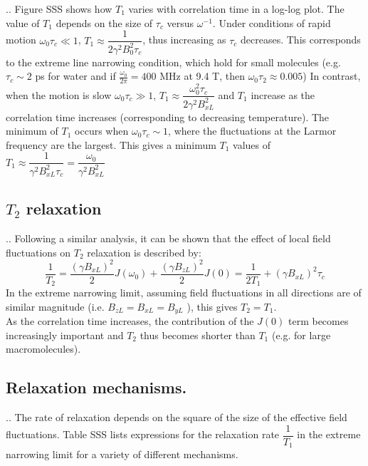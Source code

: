 \documentclass{beamer}
\begin{document}
\begin{frame}{\thesection.\thesubsection. \insertsubsection}
	  Figure SSS shows how $T_1$ varies with correlation time in a log-log plot. The value of $T_1$ depends on the size of $\tau_c$ versus $\omega^{-1}$. Under conditions of rapid motion $ \omega_0 \tau_c \ll 1$, $T_1 \approx \dfrac{1}{2 \gamma^2 B_0^2 \tau_c}$, thus increasing as $\tau_c$ decreases. This corresponds to the \alert{extreme line narrowing condition}, which hold for small molecules (e.g. $\tau_c \sim 2$ ps for water and if $\frac{\omega_0}{2 \pi}  = 400$ MHz at 9.4 T, then $\omega_0 \tau_2 \approx 0.005$)
	  In contrast, when the motion is slow $\omega_0 \tau_c \gg 1$, $T_1 \approx \dfrac{\omega_0^2 \tau_c}{2 \gamma^2 B_{xL}^2}$ and $T_1$ increase as the correlation time increases (corresponding to decreasing temperature).
	  The minimum of $T_1$ occurs when $\omega_0 \tau_c \sim 1$, where the fluctuations at the Larmor frequency are the largest. This gives a minimum $T_1$ values of $T_1 \approx \dfrac{1}{\gamma^2 B_{xL}^2 \tau_c} = \dfrac{\omega_0}{\gamma^2 B_{xL}^2}$
\end{frame}

\subsection{$T_2$ relaxation}
\begin{frame}{\thesection.\thesubsection. \insertsubsection}
	Following a similar analysis, it can be shown that the effect of local field fluctuations on $T_2$ relaxation is described by:
	\begin{equation} \label{eq: T2_relax}
	\dfrac{1}{T_2} = \dfrac{(\gamma B_{xL})^2}{2} J(\omega_0) + \dfrac{(\gamma B_{zL})^2}{2} J(0) = \dfrac{1}{2 T_1} + (\gamma B_{xL})^2 \tau_c
	\end{equation}
	In the extreme narrowing limit, assuming field fluctuations in all directions are of similar magnitude (i.e. $B_{zL} = B_{xL} = B_{yL}$ ), this gives $T_2 = T_1$. \\
	As the correlation time increases, the contribution of the $J(0)$ term becomes increasingly important and $T_2$ thus becomes shorter than $T_1$ (e.g. for large macromolecules).
\end{frame}


\subsection{Relaxation mechanisms.}
\begin{frame}{\thesection.\thesubsection. \insertsubsection}
	The rate of relaxation depends on the square of the size of the effective field fluctuations. Table SSS lists expressions for the relaxation rate $\dfrac{1}{T_1}$ in the extreme narrowing limit for a variety of different mechanisms.
\end{frame}
\end{document}

